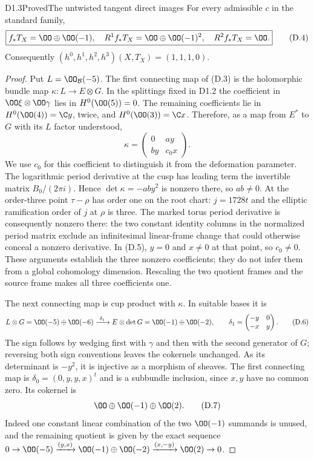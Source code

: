 \begin{claim}{D1.3}{Proved}{The untwisted tangent direct images}
For every admissible $c$ in the standard family,
\[
 \boxed{f_*T_X=\OO\oplus\OO(-1),\quad
 R^1f_*T_X=\OO\oplus\OO(-1)^2,\quad R^2f_*T_X=\OO.}   \tag{D.4}
\]
Consequently $(h^0,h^1,h^2,h^3)(X,T_X)=(1,1,1,0)$.
\end{claim}
\begin{proof}
Put $L=\OO_{\mathcal B}(-5)$. The first connecting map of (D.3) is
the holomorphic bundle map
$\kappa:L\to E\otimes G$. In the splittings fixed in D1.2 the
coefficient in $\OO\xi\otimes\OO\gamma$ lies in $H^0(\OO(5))=0$.
The remaining coefficients lie in
$H^0(\OO(4))=\C y$, twice, and $H^0(\OO(3))=\C x$.
Therefore, as a map from $E^*$ to $G$ with its $L$ factor understood,
\[
 \kappa=\begin{pmatrix}0&a y\\ b y&c_0x\end{pmatrix}. \tag{D.5}
\]
We use $c_0$ for this coefficient to distinguish it from the deformation
parameter. The logarithmic period derivative at the cusp has leading
term the invertible matrix $B_0/(2\pi i)$. Hence
$\det\kappa=-ab y^2$ is nonzero there, so $ab\ne0$.
At the order-three point $\tau-\rho$ has order one on the root chart:
$j=1728t$ and the elliptic ramification order of $j$ at $\rho$ is
three. The marked torus period derivative is consequently nonzero
there: the two constant identity columns in the normalized period
matrix exclude an infinitesimal linear-frame change that could
otherwise conceal a nonzero derivative. In (D.5), $y=0$ and
$x\ne0$ at that point, so $c_0\ne0$.
These arguments establish the three nonzero coefficients; they do not
infer them from a global cohomology dimension. Rescaling the two
quotient frames and the source frame makes all three coefficients one.

The next connecting map is cup product with $\kappa$. In suitable
bases it is
\[
 L\otimes G=\OO(-5)\oplus\OO(-6)
 \xrightarrow{\ \delta_1\ }
 E\otimes\det G=\OO(-1)\oplus\OO(-2),\qquad
 \delta_1=\begin{pmatrix}-y&0\\-x&y\end{pmatrix}.       \tag{D.6}
\]
The sign follows by wedging first with $\gamma$ and then with the
second generator of $G$; reversing both sign conventions leaves the
cokernels unchanged. As its determinant is $-y^2$, it is injective as
a morphism of sheaves. The first connecting map is
$\delta_0=(0,y,y,x)^t$ and is a subbundle inclusion, since $x,y$ have
no common zero. Its cokernel is
\[
 \OO\oplus\OO(-1)\oplus\OO(2).                       \tag{D.7}
\]
Indeed one constant linear combination of the two $\OO(-1)$ summands
is unused, and the remaining quotient is given by the exact sequence
$0\to\OO(-5)\xrightarrow{(y,x)}\OO(-1)\oplus\OO(-2)
\xrightarrow{(x,-y)}\OO(2)\to0$.


\end{proof}
